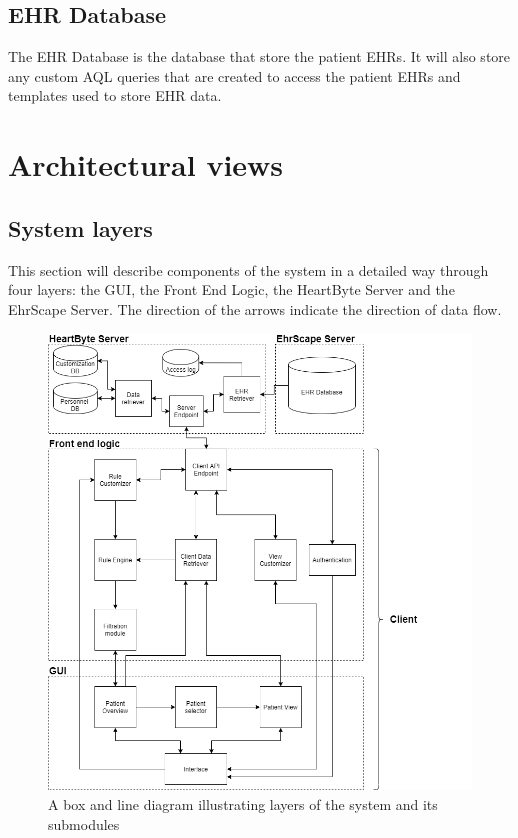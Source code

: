 \documentclass{article}
\begin{document}
\subsection{EHR Database}
The EHR Database is the database that store the patient EHRs. It will also store any custom AQL queries that are created to access the patient EHRs and templates used to store EHR data.


\section{Architectural views}
\subsection{System layers}
This section will describe components of the system in a detailed way through four layers: the GUI, the Front End Logic, the HeartByte Server and the EhrScape Server. The direction of the arrows indicate the direction of data flow.

\begin{figure}[h]
    \centering
    \includegraphics[scale = 0.3]{box-and-line}
    \caption{A box and line diagram illustrating layers of the system and its submodules}
    \label{fig:execution-view}
\end{figure}
\end{document}
